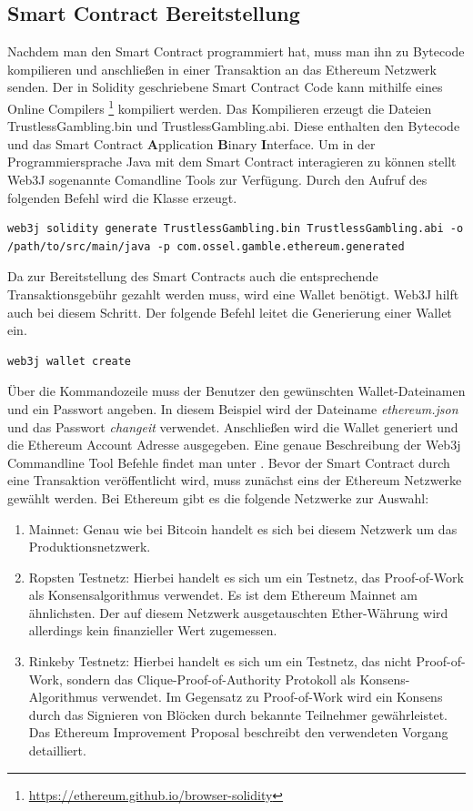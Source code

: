 \subsection{Smart Contract Bereitstellung}
Nachdem man den Smart Contract programmiert hat, muss man ihn zu Bytecode kompilieren und anschließen in einer Transaktion an das Ethereum Netzwerk senden. Der in Solidity geschriebene Smart Contract Code kann mithilfe eines Online Compilers \footnote{\url{https://ethereum.github.io/browser-solidity}} kompiliert werden. Das Kompilieren erzeugt die Dateien {TrustlessGambling.bin} und {TrustlessGambling.abi}. Diese enthalten den Bytecode und das Smart Contract \textbf{A}pplication \textbf{B}inary \textbf{I}nterface.
Um in der Programmiersprache Java mit dem Smart Contract interagieren zu können stellt Web3J sogenannte Comandline Tools zur Verfügung. Durch den Aufruf des folgenden Befehl wird die Klasse  erzeugt.
\begin{lstlisting}[basicstyle=\small]
web3j solidity generate TrustlessGambling.bin TrustlessGambling.abi -o /path/to/src/main/java -p com.ossel.gamble.ethereum.generated
\end{lstlisting}
Da zur Bereitstellung des Smart Contracts auch die entsprechende Transaktionsgebühr gezahlt werden muss, wird eine Wallet benötigt. Web3J hilft auch bei diesem Schritt. Der folgende Befehl leitet die Generierung einer Wallet ein.
\begin{lstlisting}[basicstyle=\small]
web3j wallet create
\end{lstlisting}
Über die Kommandozeile muss der Benutzer den gewünschten Wallet-Dateinamen  und ein Passwort angeben. In diesem Beispiel wird der Dateiname \textit{ethereum.json} und das Passwort \textit{changeit} verwendet. Anschließen wird die Wallet generiert und die Ethereum Account Adresse ausgegeben. Eine genaue Beschreibung der Web3j Commandline Tool Befehle findet man unter \cite{web3j_clt}.
Bevor der Smart Contract durch eine Transaktion veröffentlicht wird, muss zunächst eins der Ethereum Netzwerke gewählt werden. Bei Ethereum gibt es die folgende Netzwerke zur Auswahl:
\begin{enumerate}
\item Mainnet: Genau wie bei Bitcoin handelt es sich bei diesem Netzwerk um das Produktionsnetzwerk. 
\item Ropsten Testnetz: Hierbei handelt es sich um ein Testnetz, das Proof-of-Work als Konsensalgorithmus verwendet. Es ist dem Ethereum Mainnet am ähnlichsten. Der auf diesem Netzwerk ausgetauschten Ether-Währung wird allerdings kein finanzieller Wert zugemessen.
\item Rinkeby Testnetz: Hierbei handelt es sich um ein Testnetz, das nicht Proof-of-Work, sondern das Clique-Proof-of-Authority Protokoll als Konsens-Algorithmus verwendet. Im Gegensatz zu Proof-of-Work wird ein Konsens durch das Signieren von Blöcken durch bekannte Teilnehmer gewährleistet. Das Ethereum Improvement Proposal \cite{eip_rinkeby} beschreibt den verwendeten Vorgang detailliert.
\end{enumerate}
